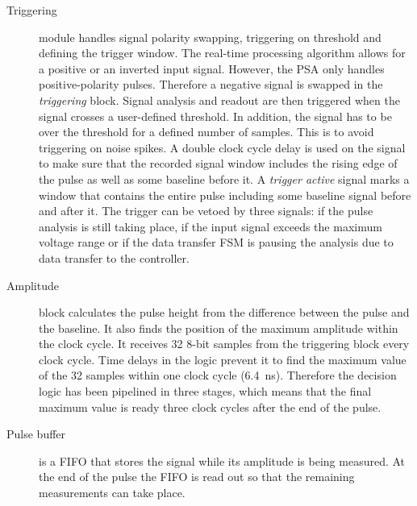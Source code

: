 \begin{description}
\item[Triggering] module handles signal polarity swapping, triggering on threshold and defining the trigger window. The real-time processing algorithm allows for a positive or an inverted input signal. However, the PSA only handles positive-polarity pulses. Therefore a negative signal is swapped in the \textit{triggering} block. Signal analysis and readout are then triggered when the signal crosses a user-defined threshold. In addition, the signal has to be over the threshold for a defined number of samples. This is to avoid triggering on noise spikes.
A double clock cycle delay is used on the signal to make sure that the recorded signal window includes the rising edge of the pulse as well as some baseline before it. A \textit{trigger active} signal marks a window that contains the entire pulse including some baseline signal before and after it. 
The trigger can be vetoed by three signals: if the pulse analysis is still taking place, if the input signal exceeds the maximum voltage range or if the data transfer FSM is pausing the analysis due to data transfer to the controller.

%


\item[Amplitude] block calculates the pulse height from the difference between the pulse and the baseline. It also finds the position of the maximum amplitude within the clock cycle. It receives 32 8-bit samples from the triggering block every clock cycle. Time delays in the logic prevent it to find the maximum value of the 32 samples within one clock cycle (6.4~ns). Therefore the decision logic has been pipelined in three stages, which means that the final maximum value is ready three clock cycles after the end of the pulse.
\item[Pulse buffer] is a FIFO that stores the signal while its amplitude is being measured. At the end of the pulse the FIFO is read out so that the remaining measurements can take place. 


\end{description}
